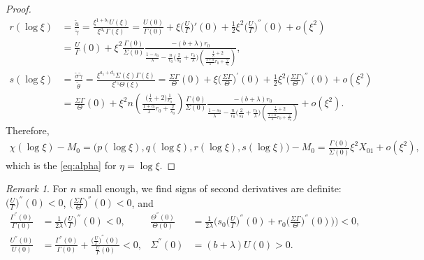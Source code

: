 \documentclass[a4paper,11pt]{article}
\def\tg{{\tilde{\gamma}}}
\def\tth{{\tilde{\theta}}}
\def\ts{{\tilde{\sigma}}}
\def\tu{{\tilde{u}}}
\theoremstyle{remark}
\newtheorem{remark}{Remark}[section]
\begin{document}
\begin{proof}
\begin{align*}
 r(\log\xi) &= \frac{\tu}{ \tg } = \frac{ \xi^{1+b_1}U(\xi) }{ \xi^{a_1}\Gamma(\xi) } = \frac{ U(0) }{ \Gamma(0) }+ \xi \Big(\frac{U}{\Gamma}\Big)'(0) + \frac{1}{2}\xi^2\Big(\frac{U}{\Gamma}\Big)^{''}(0) + o(\xi^2)\\
  &=\frac{ U }{ \Gamma }(0) + \xi^2\frac{\Gamma(0)}{\Sigma(0)} \frac{-(b+\lambda)r_0}{\frac{1-s_0}{\lambda}-\frac{n}{r_0}\Big(\frac{2}{s_0} + \frac{r_0}{\lambda}\Big)\left(\frac{ \frac{1}{\lambda}+2}{ \frac{1+\alpha}{\lambda}r_0 + \frac{2}{s_0}}\right)} ,\\
 s(\log\xi) &= \frac{\ts\tg}{\tth} = \frac{ \xi^{a_1+d_1}\Sigma(\xi)\Gamma(\xi) }{\xi^{c_1} \Theta(\xi)} = \frac{ \Sigma\Gamma }{\Theta}(0) + \xi \Big(\frac{ \Sigma\Gamma }{\Theta}\Big)^{'}(0) + \frac{1}{2}\xi^2\Big(\frac{ \Sigma\Gamma }{\Theta}\Big)^{''}(0) + o(\xi^2)\\
 &=\frac{ \Sigma\Gamma }{\Theta}(0) + \xi^2 n \left(\frac{ \big(\frac{1}{\lambda}+2\big) \frac{1}{r_0} }{ \frac{1+\alpha}{\lambda}r_0 + \frac{2}{s_0}}\right)\frac{\Gamma(0)}{\Sigma(0)} \frac{-(b+\lambda)r_0}{\frac{1-s_0}{\lambda}-\frac{n}{r_0}\Big(\frac{2}{s_0} + \frac{r_0}{\lambda}\Big)\left(\frac{ \frac{1}{\lambda}+2}{ \frac{1+\alpha}{\lambda}r_0 + \frac{2}{s_0}}\right)}+ o(\xi^2).
\end{align*}
Therefore,
\begin{align*}
\chi(\log\xi)-M_0  = \big(p(\log\xi),q(\log\xi),r(\log\xi),s(\log\xi)\big) -M_0 =  \frac{\Gamma(0)}{\Sigma(0)}\xi^2 X_{01} + o(\xi^2),
\end{align*}
which is the \eqref{eq:alpha} for $\eta=\log\xi$.
\end{proof}
\begin{remark} \label{rem:signs}
For $n$ small enough, we find signs of second derivatives are definite: $\displaystyle \Big(\frac{U}{\Gamma}\Big)^{''}(0) <0$, $\displaystyle \Big(\frac{\Sigma\Gamma}{\Theta}\Big)^{''}(0) <0$, and
\begin{equation} \label{eq:second_der}
\begin{aligned}
\frac{\Gamma^{''}(0)}{\Gamma(0)} &= \frac{1}{2\lambda}\Big(\frac{U}{\Gamma}\Big)^{''}(0) < 0, &
\frac{\Theta^{''}(0)}{\Theta(0)} &= \frac{1}{2\lambda}\Big(s_0\Big(\frac{U}{\Gamma}\Big)^{''}(0) + r_0\Big(\frac{\Sigma\Gamma}{\Theta}\Big)^{''}(0)\Big)\Big)  < 0,\\
\frac{U^{''}(0)}{U(0)} &=\frac{\Gamma^{''}(0)}{\Gamma(0)} + \frac{ \big(\frac{U}{\Gamma}\big)^{''}(0)}{\frac{U}{\Gamma}(0)}< 0,&
\Sigma^{''}(0)&=(b+\lambda)U(0)>0.
\end{aligned}
\end{equation}
\end{remark}
\end{document}
